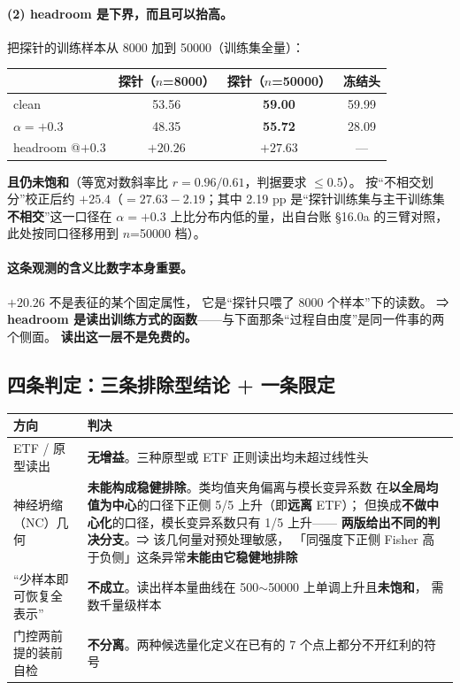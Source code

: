 \documentclass[11pt,a4paper]{ctexart}
\begin{document}
\paragraph{(2) headroom 是下界，而且可以抬高。}
把探针的训练样本从 8000 加到 50000（训练集全量）：

\begin{center}
\small
\begin{tabular}{lccc}
\toprule
& 探针（$n$=8000） & 探针（$n$=50000） & 冻结头 \\
\midrule
clean & 53.56 & \textbf{59.00} & 59.99 \\
$\alpha=+0.3$ & 48.35 & \textbf{55.72} & 28.09 \\
\midrule
headroom @$+0.3$ & $+20.26$ & $\bm{+27.63}$ & --- \\
\bottomrule
\end{tabular}
\end{center}

\textbf{且仍未饱和}（等宽对数斜率比 $r=0.96/0.61$，判据要求 $\le0.5$）。
按“不相交划分”校正后约 $+25.4$（$=27.63-2.19$；其中 2.19 pp 是“探针训练集与主干训练集
\textbf{不相交}”这一口径在 $\alpha=+0.3$ 上比分布内低的量，出自台账 \S16.0a 的三臂对照，
此处按同口径移用到 $n$=50000 档）。

\paragraph{这条观测的含义比数字本身重要。}
$+20.26$ 不是表征的某个固定属性，
它是“探针只喂了 8000 个样本”下的读数。
⇒ \textbf{headroom 是读出训练方式的函数}——与下面那条“过程自由度”是同一件事的两个侧面。
\textbf{读出这一层不是免费的。}

\subsection{四条判定：三条排除型结论 + 一条限定}

\begin{center}
\small
\begin{tabular}{p{4.2cm}p{9.6cm}}
\toprule
方向 & 判决 \\
\midrule
ETF / 原型读出 & \textbf{无增益}。三种原型或 ETF 正则读出均未超过线性头 \\
神经坍缩（NC）几何 & \textbf{未能构成稳健排除}。类均值夹角偏离与模长变异系数
  在\textbf{以全局均值为中心}的口径下正侧 5/5 上升（即\textbf{远离} ETF）；
  但换成\textbf{不做中心化}的口径，模长变异系数只有 1/5 上升——
  \textbf{两版给出不同的判决分支}。⇒ 该几何量对预处理敏感，
  「同强度下正侧 Fisher 高于负侧」这条异常\textbf{未能由它稳健地排除} \\
“少样本即可恢复全表示” & \textbf{不成立}。读出样本量曲线在 500$\sim$50000 上单调上升且\textbf{未饱和}，
  需数千量级样本 \\
门控两前提的装前自检 & \textbf{不分离}。两种候选量化定义在已有的 7 个点上都分不开红利的符号 \\
\bottomrule
\end{tabular}
\end{center}
\end{document}
